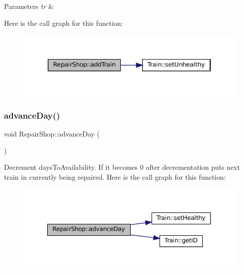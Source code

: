 \begin{DoxyParams}{Parameters}
{\em tr} & \\
\hline
\end{DoxyParams}
Here is the call graph for this function\+:
\nopagebreak
\begin{figure}[H]
\begin{center}
\leavevmode
\includegraphics[width=346pt]{classRepairShop_a9232d4d4318014f7ca2665292f118938_cgraph}
\end{center}
\end{figure}
\mbox{\label{classRepairShop_a1a5015fd8f8ad162254ef037ce15db48}} 
\subsubsection{\texorpdfstring{advance\+Day()}{advanceDay()}}
{\footnotesize\ttfamily void Repair\+Shop\+::advance\+Day (\begin{DoxyParamCaption}{ }\end{DoxyParamCaption})}

Decrement days\+To\+Availability. If it becomes 0 after decrementation puts next train in currently being repaired. Here is the call graph for this function\+:
\nopagebreak
\begin{figure}[H]
\begin{center}
\leavevmode
\includegraphics[width=350pt]{classRepairShop_a1a5015fd8f8ad162254ef037ce15db48_cgraph}
\end{center}
\end{figure}
\mbox{\label{classRepairShop_ae0def7ba65f30ff9e7ddc0228c5b7ef8}} 
